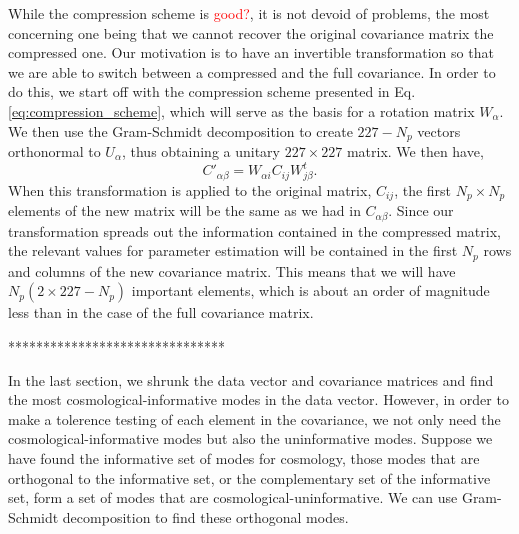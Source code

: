 \documentclass[twocolumn]{\docclass}
\newcommand\be{\begin{equation}}
\newcommand\ee{\end{equation}}
\begin{document}
While the compression scheme is \textcolor{red}{good?}, it is not devoid of problems, the most concerning one being that we cannot recover the original covariance matrix the compressed one. Our motivation is to have an invertible transformation so that we are able to switch between a compressed and the full covariance. In order to do this, we start off with the compression scheme presented in Eq. \ref{eq:compression_scheme}, which will serve as the basis for a rotation matrix $W_\alpha$. We then use the Gram-Schmidt decomposition to create $227 - N_p$ vectors orthonormal to $U_{\alpha}$, thus obtaining a unitary $227 \times 227$ matrix. We then have,
\be
C'_{\alpha\beta} = W_{\alpha i} C_{ij} W^t_{j\beta}.
\ee
 When this transformation is applied to the original matrix, $C_{ij}$, the first $N_p \times N_p$ elements of the new matrix will be the same as we had in $C_{\alpha\beta}$. Since our transformation spreads out the information contained in the compressed matrix, the relevant values for parameter estimation will be contained in the first $N_p$ rows and columns of the new covariance matrix. This means that we will have $N_p \left( 2 \times 227 - N_p \right)$ important elements, which is about an order of magnitude less than in the case of the full covariance matrix.
 
 *******************************
 
In the last section, we shrunk the data vector and covariance matrices and find the most cosmological-informative modes in the data vector. However, in order to make a tolerence testing of each element in the covariance, we not only need the cosmological-informative modes but also the uninformative modes. Suppose we have found the informative set of modes for cosmology, those modes that are orthogonal to the informative set, or the complementary set of the informative set, form a set of modes that are cosmological-uninformative. We can use Gram-Schmidt decomposition to find these orthogonal modes.
\end{document}
